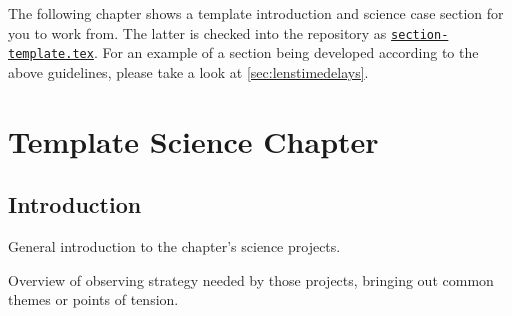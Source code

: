 The following chapter shows a template introduction and
science case section for you to work from. The latter is checked into
the repository as
\href{https://github.com/LSSTScienceCollaborations/ObservingStrategy/blob/master/whitepaper/section-template.tex}{\texttt{section-template.tex}}.
For an example of a section being developed according to the above guidelines,
please take a look at \autoref{sec:lenstimedelays}.



\setcounter{chapter}{-1}
\chapter{Template Science Chapter}
\def\chpname{example}\label{chp:\chpname}



\section{Introduction}
\label{sec:\chpname:intro}

General introduction to the chapter's science projects.

Overview of observing strategy needed by those projects, bringing
out common themes or points of tension.




